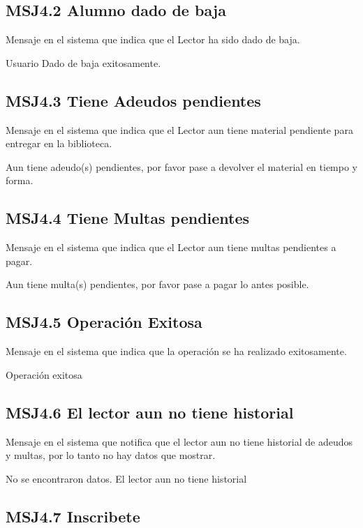  \subsection{MSJ4.2 Alumno dado de baja }

Mensaje en el sistema que indica que el Lector ha sido dado de baja.

  \noindent Usuario Dado de baja exitosamente.
  
  \subsection{MSJ4.3 Tiene Adeudos pendientes }

Mensaje en el sistema que indica que el Lector aun tiene material pendiente para entregar en la biblioteca.

  \noindent Aun tiene adeudo(s) pendientes, por favor pase a devolver el material en tiempo y forma. 

  \subsection{MSJ4.4 Tiene Multas pendientes }

Mensaje en el sistema que indica que el Lector aun tiene multas pendientes a pagar.

  \noindent Aun tiene multa(s) pendientes, por favor pase a pagar lo antes posible.
  
    \subsection{MSJ4.5 Operación Exitosa }

Mensaje en el sistema que indica que la operación se ha realizado exitosamente.

  \noindent Operación exitosa
  
      \subsection{MSJ4.6 El lector aun no tiene historial }

Mensaje en el sistema que notifica que el lector aun no tiene historial de adeudos y multas, por lo tanto no hay datos que mostrar.

  \noindent No se encontraron datos. El lector aun no tiene historial
  
  \subsection{MSJ4.7 Inscribete}

